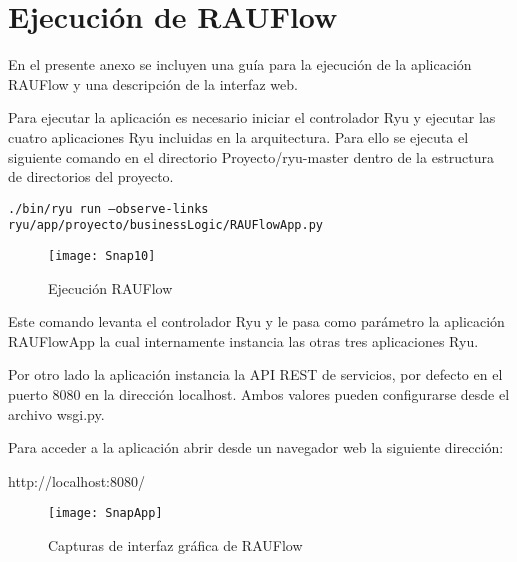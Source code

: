 
\chapter{Ejecuci\'on de RAUFlow}
\label{appendix5}

\ifpdf
    \graphicspath{{Appendix5/Figs/Raster/}{Appendix5/Figs/PDF/}{Appendix5/Figs/}}
\else
    \graphicspath{{Appendix5/Figs/Vector/}{Appendix5/Figs/}}
\fi

En el presente anexo se incluyen una guía para la ejecuci\'on de la aplicaci\'on RAUFlow y una descripción de la interfaz web.

Para ejecutar la aplicaci\'on es necesario iniciar el controlador Ryu y ejecutar las cuatro aplicaciones Ryu incluidas en la arquitectura. Para ello se ejecuta el siguiente comando en el directorio Proyecto/ryu-master dentro de la estructura de directorios del proyecto.

\begin{center}
\texttt{./bin/ryu run --observe-links ryu/app/proyecto/businessLogic/RAUFlowApp.py}
\end{center}

\begin{figure}[h] 
\centering    
\texttt{[image: Snap10]}
\caption[Ejecuci\'on RAUFlow]{Ejecuci\'on RAUFlow}
\label{fig:Img2}
\end{figure}

Este comando levanta el controlador Ryu y le pasa como parámetro la aplicaci\'on RAUFlowApp la cual internamente instancia las otras tres aplicaciones Ryu.

Por otro lado la aplicaci\'on instancia la API REST de servicios, por defecto en el puerto 8080 en la direcci\'on localhost. Ambos valores pueden configurarse desde el archivo wsgi.py.

Para acceder a la aplicaci\'on abrir desde un navegador web la siguiente direcci\'on:

\begin{center}
http://localhost:8080/
\end{center}

\newpage
\begin{figure}[ht!] 
\centering    
\texttt{[image: SnapApp]}
\caption[Capturas de interfaz gráfica de RAUFlow]{Capturas de interfaz gráfica de RAUFlow}
\label{fig:Img2}
\end{figure}